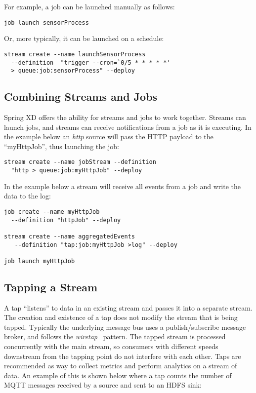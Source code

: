 For example, a job can be launched manually as follows:

\begin{lstlisting}
job launch sensorProcess
\end{lstlisting}

Or, more typically, it can be launched on a schedule:

\begin{lstlisting}
stream create --name launchSensorProcess
  --definition  "trigger --cron=`0/5 * * * * *'
  > queue:job:sensorProcess" --deploy
\end{lstlisting}

\subsection {Combining Streams and Jobs}

Spring XD offers the ability for streams and jobs to work together. Streams
can launch jobs, and streams can receive notifications from a job
as it is executing.  In the example below an \emph{http} source will pass the 
HTTP payload to the ``myHttpJob'', thus launching the job:

\begin{lstlisting}
stream create --name jobStream --definition
  "http > queue:job:myHttpJob" --deploy
\end{lstlisting}

In the example below a stream will receive all events from a job and write
the data to the log:

\begin{lstlisting}
job create --name myHttpJob
  --definition "httpJob" --deploy

stream create --name aggregatedEvents
   --definition "tap:job:myHttpJob >log" --deploy

job launch myHttpJob
\end{lstlisting}

\subsection {Tapping a Stream} \label{sssec:deploytap}

A tap ``listens'' to data in an existing stream and passes it into a separate
stream. The creation and existence of a tap does not modify the stream that
is being tapped. Typically the underlying message bus uses a publish/subscribe
message broker, and follows the \emph{wiretap}~\cite{wiretap}
pattern. The tapped stream is processed concurrently with the main stream, so
 consumers with different speeds downstream from the tapping point do not
 interfere with each other. Taps are recommended as way to collect metrics and perform
analytics on a stream of data. An example of this is shown below where a
tap counts the number of MQTT messages received by a source and sent to an
HDFS sink:

